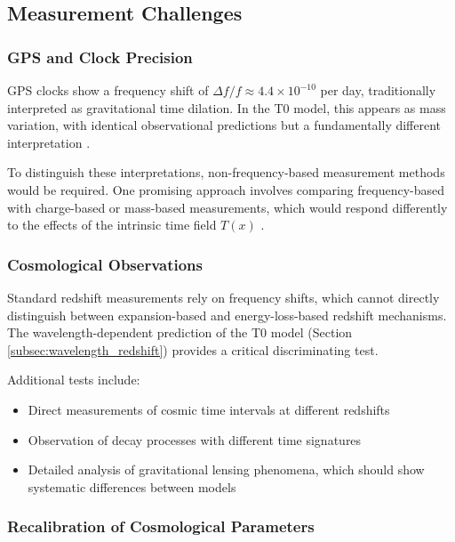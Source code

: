 \documentclass[12pt,a4paper]{article}
\newcommand{\Tfield}{T(x)}
\begin{document}
	\subsection{Measurement Challenges}
	\label{subsec:measurement_challenges}
	
	\subsubsection{GPS and Clock Precision}
	\label{subsec:gps_clock_problem}
	
	GPS clocks show a frequency shift of \(\Delta f/f \approx 4.4 \times 10^{-10}\) per day, traditionally interpreted as gravitational time dilation. In the T0 model, this appears as mass variation, with identical observational predictions but a fundamentally different interpretation \cite{pascher_quantum_2025}. 
	
	To distinguish these interpretations, non-frequency-based measurement methods would be required. One promising approach involves comparing frequency-based with charge-based or mass-based measurements, which would respond differently to the effects of the intrinsic time field \(\Tfield\) \cite{pascher_quantum_2025}.
	
	\subsubsection{Cosmological Observations}
	\label{subsec:cosmological_measurement_problem}
	
	Standard redshift measurements rely on frequency shifts, which cannot directly distinguish between expansion-based and energy-loss-based redshift mechanisms. The wavelength-dependent prediction of the T0 model (Section \ref{subsec:wavelength_redshift}) provides a critical discriminating test.
	
	Additional tests include:
	\begin{itemize}
		\item Direct measurements of cosmic time intervals at different redshifts
		\item Observation of decay processes with different time signatures
		\item Detailed analysis of gravitational lensing phenomena, which should show systematic differences between models \cite{pascher_alphabeta_2025}
	\end{itemize}
	
	\subsubsection{Recalibration of Cosmological Parameters}
	\label{subsec:parameter_recalibration}
	
\end{document}
